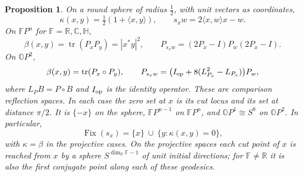 \documentclass[11pt,reqno]{amsart}
\newtheorem{proposition}[theorem]{Proposition}
\theoremstyle{definition}
\theoremstyle{remark}
\numberwithin{equation}{section}
\newcommand{\R}{\mathbb{R}}
\newcommand{\C}{\mathbb{C}}
\newcommand{\HH}{\mathbb{H}}
\newcommand{\ip}[2]{\langle #1,#2\rangle}
\begin{document}
\begin{proposition}\label{m2:models}
On a round sphere of radius $\tfrac12$, with unit vectors as coordinates,
\begin{equation}\label{m2:sphere}
 \kappa(x,y)=\tfrac12(1+\ip{x}{y}),\qquad s_xw=2\ip{x}{w}x-w .
\end{equation}
On $\mathbb FP^n$ for $\mathbb F=\R,\C,\HH$,
\begin{equation}\label{m2:associative}
 \beta(x,y)=\operatorname{tr}(P_xP_y)=|x^*y|^2,\qquad P_{s_xw}=(2P_x-I)P_w(2P_x-I).
\end{equation}
On $\mathbb OP^2$,
\begin{equation}\label{m2:albert}
 \beta(x,y)=\operatorname{tr}(P_x\circ P_y),\qquad P_{s_xw}=\bigl(I_{\rm op}+8(L_{P_x}^2-L_{P_x})\bigr)P_w ,
\end{equation}
where $L_PB=P\circ B$ and $I_{\rm op}$ is the identity operator.  These are comparison reflection spaces.  In each case the zero set at
$x$ is its cut locus and its set at distance $\pi/2$.  It is $\{-x\}$ on the sphere, $\mathbb FP^{n-1}$ on $\mathbb FP^n$, and
$\mathbb OP^1\cong S^8$ on $\mathbb OP^2$.  In particular,
\begin{equation}\label{m2:fixed}
 \operatorname{Fix}(s_x)=\{x\}\ \cup\ \{y:\kappa(x,y)=0\},
\end{equation}
with $\kappa=\beta$ in the projective cases.  On the projective spaces each cut point of $x$ is reached from $x$ by a sphere
$S^{\dim_\R\mathbb F-1}$ of unit initial directions; for $\mathbb F\ne\R$ it is also the first conjugate point along each of these geodesics.
\end{proposition}
\end{document}

